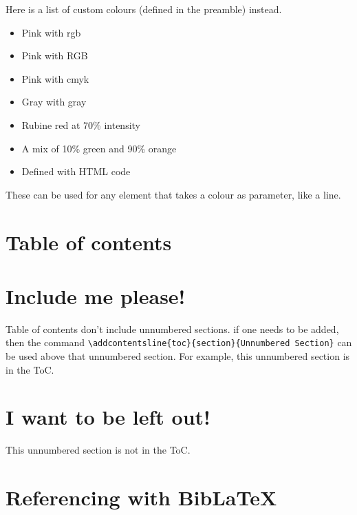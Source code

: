 \documentclass[12pt, letterpaper]{article} %
\begin{document}
Here is a list of custom colours (defined in the preamble) instead.
\begin{itemize}
	\item \textcolor{mypink1}{Pink with rgb}
	\item \textcolor{mypink2}{Pink with RGB}
	\item \textcolor{mypink3}{Pink with cmyk}
	\item \textcolor{mygray}{Gray with gray}
	\item \textcolor{LightRubineRed}{Rubine red at 70\% intensity}
	\item \textcolor{OrangeGreen}{A mix of 10\% green and 90\% orange}
	\item \textcolor{HTMLColor}{Defined with HTML code}
\end{itemize}

These can be used for any element that takes a colour as parameter, like a line.

\noindent {\color{TealBlue} \rule{\linewidth}{1mm}} %

\clearpage
\section{Table of contents}

\tableofcontents


\section*{Include me please!}

Table of contents don't include unnumbered sections. if one needs to be added, 
then the command \verb+\addcontentsline{toc}{section}{Unnumbered Section}+ 
can be used above that unnumbered section. For example, this unnumbered section 
is in the ToC.

\section*{I want to be left out!}

This unnumbered section is not in the ToC.

\clearpage

\section{Referencing with BibLaTeX}
\end{document}
